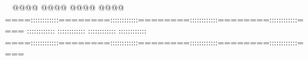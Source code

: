         @@@@                @@@@                @@@@                @@@@        ====::::::::::::========::::::::::::========::::::::::::========::::::::::::====    ::::::::::::        ::::::::::::        ::::::::::::        ::::::::::::    ====::::::::::::========::::::::::::========::::::::::::========::::::::::::====                                                                                 